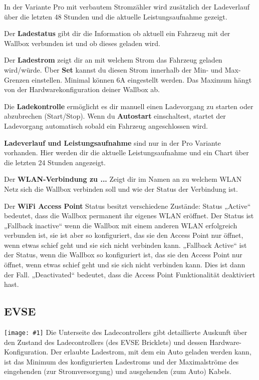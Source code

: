 \documentclass[a4paper,10pt]{article}
\newcommand{\gfx}[1]{\texttt{[image: \#1]}}
\begin{document}
\begin{multicols*}{2}
	In der Variante Pro mit verbautem Stromzähler wird zusätzlich der Ladeverlauf 
	über die letzten 48 Stunden und die aktuelle Leistungsaufnahme gezeigt.

	Der \textbf{Ladestatus} gibt dir die Information ob aktuell ein
	Fahrzeug mit der Wallbox verbunden ist und ob dieses geladen wird.

	Der \textbf{Ladestrom} zeigt dir an mit welchem Strom das Fahrzeug geladen
	wird/würde. Über \textbf{Set} kannst du diesen Strom innerhalb der Min-
	und Max-Grenzen einstellen. Minimal können 6A eingestellt werden. Das
	Maximum hängt von der Hardwarekonfiguration deiner Wallbox ab.
	
	Die \textbf{Ladekontrolle} ermöglicht es dir manuell einen Ladevorgang zu
	starten oder abzubrechen (Start/Stop). Wenn du \textbf{Autostart}
	einschaltest, startet der Ladevorgang automatisch sobald ein Fahrzeug
	angeschlossen wird.

	\textbf{Ladeverlauf und Leistungsaufnahme} sind nur in der Pro Variante
	vorhanden. Hier werden dir die aktuelle Leistungsaufnahme und ein Chart über
	die letzten 24 Stunden angezeigt.

	Der \textbf{WLAN-Verbindung zu ...} Zeigt dir im Namen an zu welchem WLAN 
	Netz sich die Wallbox verbinden soll und wie der Status der Verbindung ist.

	Der \textbf{WiFi Access Point} Status besitzt verschiedene Zustände: Status
	„Active“ bedeutet, dass die Wallbox permanent ihr eigenes WLAN eröffnet. Der
	Status ist „Fallback inactive“ wenn die Wallbox mit einem anderen WLAN
	erfolgreich verbunden ist, sie ist aber so konfiguriert, das sie den Access
	Point nur öffnet, wenn etwas schief geht und sie sich nicht verbinden kann.
	„Fallback Active“ ist der Status, wenn die Wallbox so konfiguriert ist, das sie
	den Access Point nur öffnet, wenn etwas schief geht und sie sich nicht
	verbinden kann. Dies ist dann der Fall. „Deactivated“ bedeutet, dass die Access
	Point Funktionalität deaktiviert hast.

	\subsection{EVSE}
	\gfx{./img/resized/web_evse}
	Die Unterseite des Ladecontrollers gibt detaillierte Auskunft über den Zustand
	des Ladecontrollers (des EVSE Bricklets) und dessen Hardware-Konfiguration. Der
	erlaubte Ladestrom, mit dem ein Auto geladen werden kann, ist das Minimum des 
	konfigurierten Ladestroms und der Maximalströme des eingehenden 
	(zur Stromversorgung) und ausgehenden (zum Auto) Kabels.


\end{multicols*}
\end{document}
